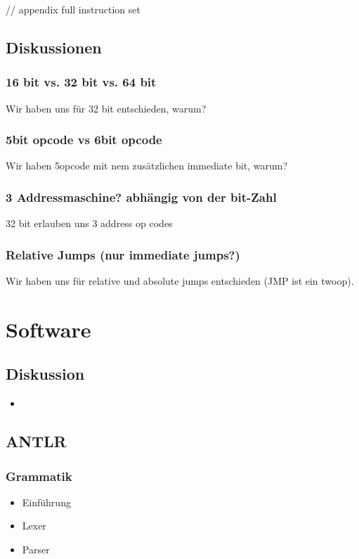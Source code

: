 \documentclass[paper=a4,fontsize=10pt]{scrreprt}
\begin{document}
// appendix full instruction set

\section{Diskussionen}

\subsection{16 bit vs. 32 bit vs. 64 bit}
Wir haben uns für 32 bit entschieden, warum?

\subsection{5bit opcode vs 6bit opcode}
Wir haben 5opcode mit nem zusätzlichen immediate bit, warum?

\subsection{3 Addressmaschine? abhängig von der bit-Zahl}
32 bit erlauben uns 3 address op codes

\subsection{Relative Jumps (nur immediate jumps?)}
Wir haben uns für relative und absolute jumps entschieden (JMP ist ein twoop).

\chapter{Software}

\section{Diskussion}
\begin{itemize}
    \item
\end{itemize}

\section{ANTLR}
\subsection{Grammatik}
\begin{itemize}
    \item Einführung
    \item Lexer
    \item Parser
\end{itemize}
\end{document}
